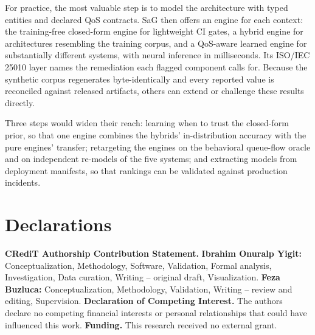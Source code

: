 \documentclass[preprint,3p]{elsarticle}
\begin{document}
For practice, the most valuable step is to model the architecture with typed entities and declared QoS contracts. SaG then offers an engine for each context: the training-free closed-form engine for lightweight CI gates, a hybrid engine for architectures resembling the training corpus, and a QoS-aware learned engine for substantially different systems, with neural inference in milliseconds. Its ISO/IEC 25010 layer names the remediation each flagged component calls for. Because the synthetic corpus regenerates byte-identically and every reported value is reconciled against released artifacts, others can extend or challenge these results directly.

Three steps would widen their reach: learning when to trust the closed-form prior, so that one engine combines the hybrids' in-distribution accuracy with the pure engines' transfer; retargeting the engines on the behavioral queue-flow oracle and on independent re-models of the five systems; and extracting models from deployment manifests, so that rankings can be validated against production incidents.


\section*{Declarations}

\noindent\textbf{CRediT Authorship Contribution Statement.} \textbf{Ibrahim Onuralp Yigit:} Conceptualization, Methodology, Software, Validation, Formal analysis, Investigation, Data curation, Writing -- original draft, Visualization. \textbf{Feza Buzluca:} Conceptualization, Methodology, Validation, Writing -- review and editing, Supervision.
\textbf{Declaration of Competing Interest.} The authors declare no competing financial interests or personal relationships that could have influenced this work.
\textbf{Funding.} This research received no external grant.
\end{document}
